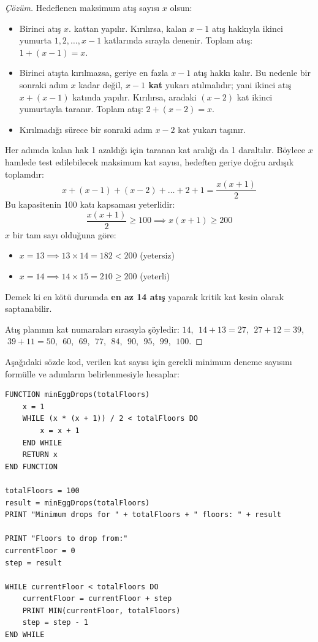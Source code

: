 \begin{proof}[Çözüm]
Hedeflenen maksimum atış sayısı $x$ olsun:
\begin{itemize}
    \item Birinci atış $x$. kattan yapılır. Kırılırsa, kalan $x-1$ atış hakkıyla ikinci yumurta $1, 2, \dots, x-1$ katlarında sırayla denenir. Toplam atış: $1 + (x-1) = x$.
    \item Birinci atışta kırılmazsa, geriye en fazla $x-1$ atış hakkı kalır. Bu nedenle bir sonraki adım $x$ kadar değil, \textbf{$x-1$ kat} yukarı atılmalıdır; yani ikinci atış $x + (x-1)$ katında yapılır. Kırılırsa, aradaki $(x-2)$ kat ikinci yumurtayla taranır. Toplam atış: $2 + (x-2) = x$.
    \item Kırılmadığı sürece bir sonraki adım $x-2$ kat yukarı taşınır.
\end{itemize}

Her adımda kalan hak 1 azaldığı için taranan kat aralığı da 1 daraltılır. Böylece $x$ hamlede test edilebilecek maksimum kat sayısı, hedeften geriye doğru ardışık toplamdır:
\[
x + (x-1) + (x-2) + \dots + 2 + 1 = \frac{x(x+1)}{2}
\]
Bu kapasitenin 100 katı kapsaması yeterlidir:
\[
\frac{x(x+1)}{2} \ge 100 \implies x(x+1) \ge 200
\]
$x$ bir tam sayı olduğuna göre:
\begin{itemize}
    \item $x = 13 \implies 13 \times 14 = 182 < 200$ (yetersiz)
    \item $x = 14 \implies 14 \times 15 = 210 \ge 200$ (yeterli)
\end{itemize}
Demek ki en kötü durumda \textbf{en az 14 atış} yaparak kritik kat kesin olarak saptanabilir.

Atış planının kat numaraları sırasıyla şöyledir:
$14$, $\;14+13=27$, $\;27+12=39$, $\;39+11=50$, $\;60$, $\;69$, $\;77$, $\;84$, $\;90$, $\;95$, $\;99$, $\;100$.
\end{proof}

Aşağıdaki sözde kod, verilen kat sayısı için gerekli minimum deneme sayısını formülle ve adımların belirlenmesiyle hesaplar:

\begin{lstlisting}
FUNCTION minEggDrops(totalFloors)
    x = 1
    WHILE (x * (x + 1)) / 2 < totalFloors DO
        x = x + 1
    END WHILE
    RETURN x
END FUNCTION

totalFloors = 100
result = minEggDrops(totalFloors)
PRINT "Minimum drops for " + totalFloors + " floors: " + result

PRINT "Floors to drop from:"
currentFloor = 0
step = result

WHILE currentFloor < totalFloors DO
    currentFloor = currentFloor + step
    PRINT MIN(currentFloor, totalFloors)
    step = step - 1
END WHILE\end{lstlisting}


